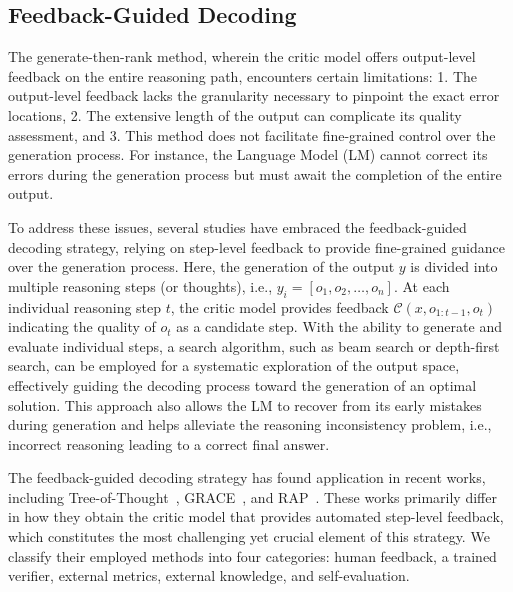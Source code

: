 \documentclass[a4paper,oneside]{book}
\begin{document}
\subsection{Feedback-Guided Decoding}
The generate-then-rank method, wherein the critic model offers output-level feedback on the entire reasoning path, encounters certain limitations: 1. The output-level feedback lacks the granularity necessary to pinpoint the exact error locations, 2. The extensive length of the output can complicate its quality assessment, and 3. This method does not facilitate fine-grained control over the generation process. For instance, the Language Model (LM) cannot correct its errors during the generation process but must await the completion of the entire output.

To address these issues, several studies have embraced the feedback-guided decoding strategy, relying on step-level feedback to provide fine-grained guidance over the generation process. Here, the generation of the output $y$ is divided into multiple reasoning steps (or thoughts), i.e., $y_{i}=\left[o_{1}, o_{2}, \ldots, o_{n}\right]$. At each individual reasoning step $t$, the critic model provides feedback $\mathcal{C}\left(x, o_{1: t-1}, o_{t}\right)$ indicating the quality of $o_{t}$ as a candidate step. With the ability to generate and evaluate individual steps, a search algorithm, such as beam search or depth-first search, can be employed for a systematic exploration of the output space, effectively guiding the decoding process toward the generation of an optimal solution. This approach also allows the LM to recover from its early mistakes during generation and helps alleviate the reasoning inconsistency problem, i.e., incorrect reasoning leading to a correct final answer.

The feedback-guided decoding strategy has found application in recent works, including Tree-of-Thought~\cite{yao2023tree}, GRACE~\cite{khalifa2023grace}, and RAP~\cite{hao2023reasoning}. These works primarily differ in how they obtain the critic model that provides automated step-level feedback, which constitutes the most challenging yet crucial element of this strategy. We classify their employed methods into four categories: human feedback, a trained verifier, external metrics, external knowledge, and self-evaluation.
\end{document}
